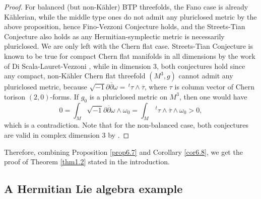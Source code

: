 \documentclass{amsart}
\numberwithin{equation}{section}
\theoremstyle{definition}
\renewcommand{\1}{\mathds{1}}
\renewcommand{\>}{\rightarrow}
\begin{document}
\begin{proof}
For balanced (but non-K\"ahler) BTP threefolds, the Fano case is already K\"ahlerian, while the middle type ones do not admit any pluriclosed metric by the above proposition, hence Fino-Vezzoni Conjecture holds, and the Streets-Tian Conjecture also holds as any Hermitian-symplectic metric is necessarily pluriclosed. We are only left with the Chern flat case. Streets-Tian Conjecture is known to be true for compact Chern flat manifolds in all dimensions by the work of Di Scala-Lauret-Vezzoni  \cite[Proposition 3.3]{DLV}, while in dimension $3$, both conjectures hold since any compact, non-K\"ahler Chern flat threefold $(M^3,g)$ cannot admit any pluriclosed metric, because $\sqrt{-1} \partial \overline{\partial} \omega = \,^t\!\tau \wedge \overline{\tau}$,
where $\tau$ is column vector of Chern torison $(2,0)$-forms. If $g_0$ is a pluriclosed metric on $M^3$, then one would have
$$ 0 =\int_M \sqrt{-1} \partial \overline{\partial} \omega \wedge \omega_0 = \int_M \,^t\!\tau \wedge \overline{\tau} \wedge \omega_0 >0, $$
which is a contradiction. Note that for the non-balanced case, both conjectures are valid in complex dimension $3$ by \cite[Corollary 1.19]{ZhaoZ24}.
\end{proof}

Therefore, combining Proposition \ref{prop6.7} and Corollary \ref{cor6.8}, we get the proof of Theorem \ref{thm1.2} stated in the introduction.


\subsection{A Hermitian Lie algebra example}\label{example}
\end{document}
